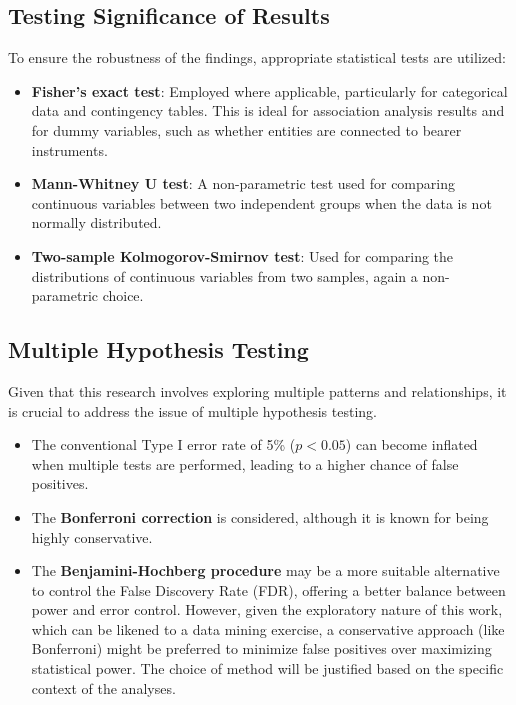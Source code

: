 \begin{enumerate}
\subsection{Testing Significance of Results}
\label{subsec:significance_testing}
To ensure the robustness of the findings, appropriate statistical tests are utilized:
\begin{itemize}
    \item \textbf{Fisher's exact test}: Employed where applicable, particularly for categorical data and contingency tables. This is ideal for association analysis results and for dummy variables, such as whether entities are connected to bearer instruments.
    \item \textbf{Mann-Whitney U test}: A non-parametric test used for comparing continuous variables between two independent groups when the data is not normally distributed.
    \item \textbf{Two-sample Kolmogorov-Smirnov test}: Used for comparing the distributions of continuous variables from two samples, again a non-parametric choice.
\end{itemize}

\subsection{Multiple Hypothesis Testing}
\label{subsec:multiple_hypothesis_testing}
Given that this research involves exploring multiple patterns and relationships, it is crucial to address the issue of multiple hypothesis testing.
\begin{itemize}
    \item The conventional Type I error rate of 5\% ($p < 0.05$) can become inflated when multiple tests are performed, leading to a higher chance of false positives.
    \item The \textbf{Bonferroni correction} is considered, although it is known for being highly conservative.
    \item The \textbf{Benjamini-Hochberg procedure} may be a more suitable alternative to control the False Discovery Rate (FDR), offering a better balance between power and error control. However, given the exploratory nature of this work, which can be likened to a data mining exercise, a conservative approach (like Bonferroni) might be preferred to minimize false positives over maximizing statistical power. The choice of method will be justified based on the specific context of the analyses.
\end{itemize}


\end{enumerate}
